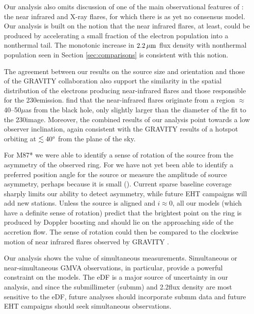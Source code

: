 Our analysis also omits discussion of one of the main observational features of \sgra: the near infrared and X-ray flares, for which there is as yet no consensus model.
Our analysis is built on the notion that the near infrared flares, at least, could be produced by accelerating a small fraction of the electron population into a nonthermal tail.
The monotonic increase in $2.2\,\mu\mathrm{m}$ flux density with nonthermal population seen in Section \ref{sec:comparisons} is consistent with this notion.

The agreement between our results on the source size and orientation and those of the GRAVITY collaboration \citep{2018A&A...618L..10G} also support the similarity in the spatial distribution of the electrons producing near-infrared flares and those responsible for the 230\GHz emission.
\citealt{2018A&A...618L..10G} find that the near-infrared flares originate from a region $\approx$ 40--50$\mu$as from the black hole, only slightly larger than the diameter of the \mring fit to the 230\GHz image.
Moreover, the combined results of our analysis point towards a low observer inclination, again consistent with the GRAVITY results of a hotspot orbiting at $\lesssim 40\degree$ from the plane of the sky.

For M87* we were able to identify a sense of rotation of the source from the asymmetry of the observed ring.
For \sgra we have not yet been able to identify a preferred position angle for the source or measure the amplitude of source asymmetry, perhaps because it is small ().
Current sparse baseline coverage sharply limits our ability to detect asymmetry, while future EHT campaigns will add new stations.
Unless the source is aligned and $i \approx 0$, all our models (which have a definite sense of rotation) predict that the brightest point on the ring is produced by Doppler boosting and should lie on the approaching side of the accretion flow.
The sense of rotation could then be compared to the clockwise motion of near infrared flares observed by GRAVITY \citep{2018A&A...618L..10G}.

Our analysis shows the value of simultaneous measurements.
Simultaneous or near-simultaneous GMVA observations, in particular, provide a powerful constraint on the models.
The eDF is a major source of uncertainty in our analysis, and since the submillimeter (submm) and 2.2\um flux density are most sensitive to the eDF, future analyses should incorporate submm data and future EHT campaigns should seek simultaneous observations.

